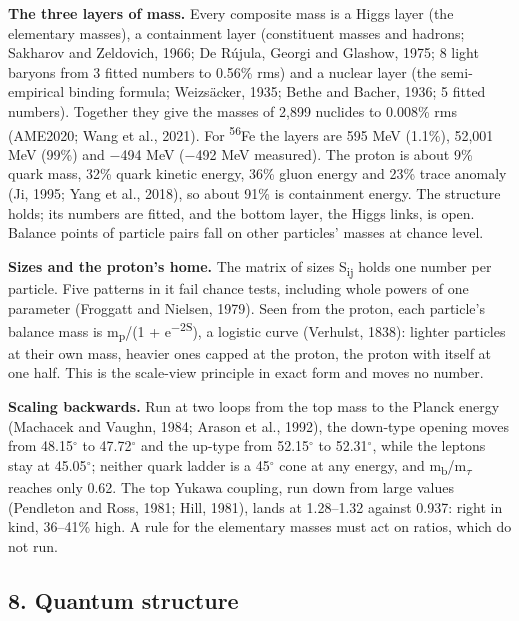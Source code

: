 \documentclass[
  11pt,
]{article}
\begin{document}
\textbf{The three layers of mass.} Every composite mass is a Higgs layer (the elementary masses), a containment layer (constituent masses and hadrons; Sakharov and Zeldovich, 1966; De Rújula, Georgi and Glashow, 1975; 8 light baryons from 3 fitted numbers to 0.56\% rms) and a nuclear layer (the semi-empirical binding formula; Weizsäcker, 1935; Bethe and Bacher, 1936; 5 fitted numbers). Together they give the masses of 2,899 nuclides to 0.008\% rms (AME2020; Wang et al., 2021). For \textsuperscript{56}Fe the layers are 595 MeV (1.1\%), 52,001 MeV (99\%) and \ensuremath{-}494 MeV (\ensuremath{-}492 MeV measured). The proton is about 9\% quark mass, 32\% quark kinetic energy, 36\% gluon energy and 23\% trace anomaly (Ji, 1995; Yang et al., 2018), so about 91\% is containment energy. The structure holds; its numbers are fitted, and the bottom layer, the Higgs links, is open. Balance points of particle pairs fall on other particles' masses at chance level.

\textbf{Sizes and the proton's home.} The matrix of sizes S\textsubscript{ij} holds one number per particle. Five patterns in it fail chance tests, including whole powers of one parameter (Froggatt and Nielsen, 1979). Seen from the proton, each particle's balance mass is m\textsubscript{p}/(1 + e\textsuperscript{\ensuremath{-}2S}), a logistic curve (Verhulst, 1838): lighter particles at their own mass, heavier ones capped at the proton, the proton with itself at one half. This is the scale-view principle in exact form and moves no number.

\textbf{Scaling backwards.} Run at two loops from the top mass to the Planck energy (Machacek and Vaughn, 1984; Arason et al., 1992), the down-type opening moves from 48.15\ensuremath{^\circ} to 47.72\ensuremath{^\circ} and the up-type from 52.15\ensuremath{^\circ} to 52.31\ensuremath{^\circ}, while the leptons stay at 45.05\ensuremath{^\circ}; neither quark ladder is a 45\ensuremath{^\circ} cone at any energy, and m\textsubscript{b}/m\textsubscript{\ensuremath{\tau}} reaches only 0.62. The top Yukawa coupling, run down from large values (Pendleton and Ross, 1981; Hill, 1981), lands at 1.28--1.32 against 0.937: right in kind, 36--41\% high. A rule for the elementary masses must act on ratios, which do not run.

\hypertarget{quantum-structure}{%
\subsection{8. Quantum structure}\label{quantum-structure}}
\end{document}

